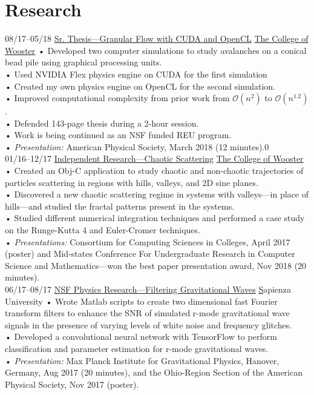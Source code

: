 \documentclass[]{friggeri-cv}
\newcommand{\bigO}{\mathcal{O}}
\begin{document}
\section{Research}
\begin{entrylist}
\entry
    {08/17–05/18}
    {\href{}{Sr. Thesis—Granular Flow with CUDA and OpenCL}}
    {\href{https://www.wooster.edu/}{The College of Wooster}}
    {
    •   Developed two computer simulations to study avalanches on a conical bead pile using graphical processing units.\\
    •   Used NVIDIA Flex physics engine on CUDA for the first simulation \\
    •   Created my own physics engine on OpenCL for the second simulation.\\
    •   Improved computational complexity from prior work from $\bigO(n^2)$ to $\bigO(n^{1.2})$.\\
    •   Defended 143-page thesis during a 2-hour session.\\
    •	Work is being continued as an NSF funded REU program.\\
    •	\emph{Presentation:} American Physical Society, March 2018 (12 minutes).0\\}
\entry
    {01/16–12/17}
    {\href{https://github.com/avivajpeyi/Chaos_CS200}{Independent Research—Chaotic Scattering}}
    {\href{https://www.wooster.edu/}{The College of Wooster}}
    {  
    •	Created an Obj-C application to study chaotic and non-chaotic trajectories of particles scattering in regions with hills, valleys, and 2D sine planes. \\
    •	Discovered a new chaotic scattering regime in systems with valleys—in place of hills—and studied the fractal patterns present in the systems. \\
    •	Studied different numerical integration techniques and performed a case study on the Runge-Kutta 4 and Euler-Cromer techniques.\\
    •	\emph{Presentations:} Consortium for Computing Sciences in Colleges, April 2017 (poster) and Mid-states Conference For Undergraduate Research in Computer Science and Mathematics—won the best paper presentation award, Nov 2018 (20 minutes).\\ }
\entry
    {06/17–08/17}
    {\href{http://meetings.aps.org/Meeting/OSF17/Session/D1.18}{NSF Physics Research—Filtering Gravitational Waves}}
    {\href{http://en.uniroma1.it/}Sapienza University}
    {•	Wrote Matlab scripts to create two dimensional fast Fourier transform filters to enhance the SNR of simulated r-mode gravitational wave signals in the presence of varying levels of white noise and frequency glitches.\\
    •	Developed a convolutional neural network with TensorFlow to perform classification and parameter estimation for r-mode gravitational waves. \\
    •	\emph{Presentation:} Max Planck Institute for Gravitational Physics, Hanover, Germany, Aug 2017 (20 minutes), and the Ohio-Region Section of the American Physical Society, Nov 2017 (poster).\\ }


\end{entrylist}
\end{document}
